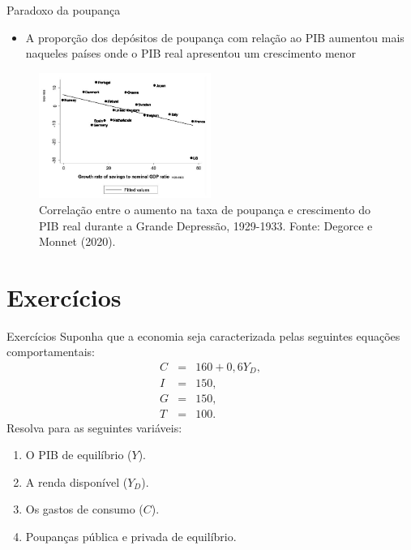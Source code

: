 \documentclass[10pt]{beamer}
\begin{document}
\begin{frame}{Paradoxo da poupança}
    \begin{itemize}
        \item A proporção dos depósitos de poupança com relação ao PIB aumentou mais naqueles países onde o PIB real apresentou um crescimento menor
    \end{itemize}
    \begin{figure}
        \centering
        \includegraphics[width=0.5\textwidth]{./figures/aula6_fig1.jpg}
        \caption{Correlação entre o aumento na taxa de poupança e crescimento do PIB real durante a Grande Depressão, 1929-1933. Fonte: Degorce e Monnet (2020).}
        \label{aula5_fig1}
    \end{figure}
\end{frame}

\section{Exercícios}
\begin{frame}{Exercícios}
    Suponha que a economia seja caracterizada pelas seguintes equações comportamentais:
    \begin{eqnarray}
        C &=& 160 + 0,6Y_D, \nonumber \\
        I &=& 150, \nonumber \\
        G &=& 150, \nonumber \\
        T &=& 100. \nonumber
    \end{eqnarray}
    Resolva para as seguintes variáveis:
    \begin{enumerate}
        \item O PIB de equilíbrio ($Y$).

        \item A renda disponível ($Y_D$).

        \item Os gastos de consumo ($C$).

        \item Poupanças pública e privada de equilíbrio.
    \end{enumerate}
\end{frame}
\end{document}
